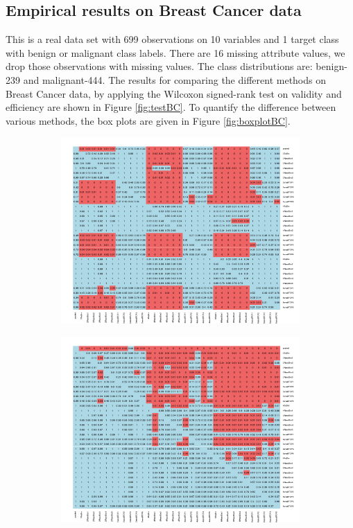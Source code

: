 \documentclass[main]{subfiles}
\begin{document}
\subsection{Empirical results on Breast Cancer data}
This is a real data set with 699 observations on 10 variables and 1 target class with benign or malignant class labels. There are 16 missing attribute values, we drop those observations with missing values. The class distributions are: benign-239 and malignant-444.
The results for comparing the different methods on Breast Cancer data, by applying the Wilcoxon signed-rank test on validity and efficiency are shown in Figure \ref{fig:testBC}. To quantify the difference between various methods, the box plots are given in Figure \ref{fig:boxplotBC}.
 \begin{figure}[h]
\centering
\begin{subfigure}{.5\textwidth}
  \centering
  \includegraphics[width=\linewidth]{images/heatmapBC}
\end{subfigure}%
\begin{subfigure}{.5\textwidth}
  \centering
  \includegraphics[width=\linewidth]{images/heatmapBC_eff}

\end{subfigure}
\end{figure}
\end{document}
